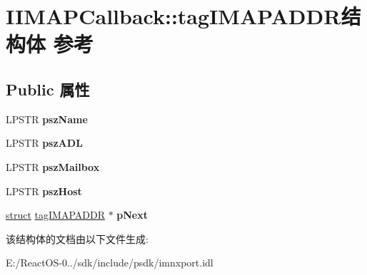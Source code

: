 \hypertarget{struct_i_i_m_a_p_callback_1_1tag_i_m_a_p_a_d_d_r}{}\section{I\+I\+M\+A\+P\+Callback\+:\+:tag\+I\+M\+A\+P\+A\+D\+D\+R结构体 参考}
\label{struct_i_i_m_a_p_callback_1_1tag_i_m_a_p_a_d_d_r}
\subsection*{Public 属性}
\begin{DoxyCompactItemize}
\item 
\mbox{\label{struct_i_i_m_a_p_callback_1_1tag_i_m_a_p_a_d_d_r_a2631cbd0f4e5e35d2c75b86ecaee1a77}} 
L\+P\+S\+TR {\bfseries psz\+Name}
\item 
\mbox{\label{struct_i_i_m_a_p_callback_1_1tag_i_m_a_p_a_d_d_r_ae582dba007878321d0d5f3a02125b4d5}} 
L\+P\+S\+TR {\bfseries psz\+A\+DL}
\item 
\mbox{\label{struct_i_i_m_a_p_callback_1_1tag_i_m_a_p_a_d_d_r_adb2e7cffdee0e37d0859ca01b9e2003b}} 
L\+P\+S\+TR {\bfseries psz\+Mailbox}
\item 
\mbox{\label{struct_i_i_m_a_p_callback_1_1tag_i_m_a_p_a_d_d_r_a4d5fcf54c2a3c6c01103f587fa367196}} 
L\+P\+S\+TR {\bfseries psz\+Host}
\item 
\mbox{\label{struct_i_i_m_a_p_callback_1_1tag_i_m_a_p_a_d_d_r_a02f7df263b115da8fec13dd0639b5e80}} 
\hyperlink{interfacestruct}{struct} \hyperlink{struct_i_i_m_a_p_callback_1_1tag_i_m_a_p_a_d_d_r}{tag\+I\+M\+A\+P\+A\+D\+DR} $\ast$ {\bfseries p\+Next}
\end{DoxyCompactItemize}


该结构体的文档由以下文件生成\+:\begin{DoxyCompactItemize}
\item 
E\+:/\+React\+O\+S-\/0../sdk/include/psdk/imnxport.\+idl\end{DoxyCompactItemize}
